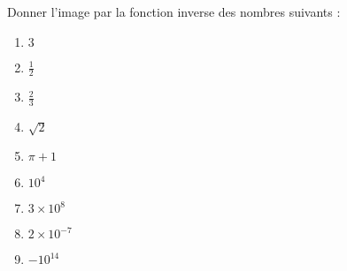 
\begin{exercice}\label{exosmath-0273}

    Donner l'image par la fonction inverse des nombres suivants :
    \begin{multicols}{3}
        \begin{enumerate}
            \item
                \( 3\)
            \item
                \( \frac{ 1 }{2}\)
            \item
                \( \frac{ 2 }{ 3 }\)
            \item
                \( \sqrt{2}\)
            \item
                \( \pi+1\)
            \item
                \( 10^4\)
            \item
                \( 3\times 10^8\)
            \item
                \( 2\times 10^{-7}\)
            \item
                \( -10^{14}\)
        \end{enumerate}
    \end{multicols}

\end{exercice}
